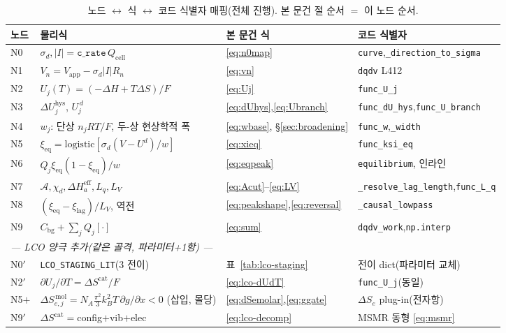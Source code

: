 \documentclass[11pt,a4paper]{article}
\newcommand{\eff}{\mathrm{eff}}
\newcommand{\eq}{\mathrm{eq}}
\newcommand{\app}{\mathrm{app}}
\newcommand{\cell}{\mathrm{cell}}
\newcommand{\bg}{\mathrm{bg}}
\newcommand{\hys}{\mathrm{hys}}
\newcommand{\code}[1]{\texttt{#1}}
\begin{document}
\begin{table}[t]
\centering
\renewcommand{\arraystretch}{1.3}
\caption{노드 $\leftrightarrow$ 식 $\leftrightarrow$ 코드 식별자 매핑(전체 진행). 본 문건 절 순서 $=$ 이 노드 순서.}
\label{tab:nodemap}
\begin{tabular}{l l l l}
\toprule
노드 & 물리식 & 본 문건 식 & 코드 식별자 \\
\midrule
N0 & $\sigma_d,|I|=\code{c\_rate}\,Q_\cell$ & \eqref{eq:n0map} & \code{curve},\code{\_direction\_to\_sigma} \\
N1 & $V_n=V_\app-\sigma_d|I|R_n$ & \eqref{eq:vn} & \code{dqdv} L412 \\
N2 & $U_j(T)=(-\Delta H+T\Delta S)/F$ & \eqref{eq:Uj} & \code{func\_U\_j} \\
N3 & $\Delta U_j^\hys$, $U_j^{\,d}$ & \eqref{eq:dUhys},\eqref{eq:Ubranch} & \code{func\_dU\_hys},\code{func\_U\_branch} \\
N4 & $w_j$: 단상 $n_jRT/F$, 두-상 현상학적 폭 & \eqref{eq:wbase}, \S\ref{sec:broadening} & \code{func\_w},\code{\_width} \\
N5 & $\xi_\eq=\mathrm{logistic}[\sigma_d(V-U^d)/w]$ & \eqref{eq:xieq} & \code{func\_ksi\_eq} \\
N6 & $Q_j\xi_\eq(1-\xi_\eq)/w$ & \eqref{eq:eqpeak} & \code{equilibrium}, 인라인 \\
N7 & $\mathcal A,\chi_d,\Delta H_a^\eff,L_q,L_V$ & \eqref{eq:Acut}--\eqref{eq:LV} & \code{\_resolve\_lag\_length},\code{func\_L\_q} \\
N8 & $(\xi_\eq-\xi_\mathrm{lag})/L_V$, 역전 & \eqref{eq:peakshape},\eqref{eq:reversal} & \code{\_causal\_lowpass} \\
N9 & $C_\bg+\sum_jQ_j[\cdot]$ & \eqref{eq:sum} & \code{dqdv\_work},\code{np.interp} \\
\midrule
\multicolumn{4}{l}{\emph{— LCO 양극 추가(같은 골격, 파라미터+1항) —}}\\
N0$'$ & \code{LCO\_STAGING\_LIT}(3 전이) & 표~\ref{tab:lco-staging} & 전이 dict(파라미터 교체) \\
N2$'$ & $\partial U_j/\partial T=\Delta S^\mathrm{cat}/F$ & \eqref{eq:lco-dUdT} & \code{func\_U\_j}(동일) \\
N5$+$ & $\Delta S_{e,j}^{\,\mathrm{mol}}=N_A\tfrac{\pi^2}{3}k_B^2T\,\partial g/\partial x<0$ (삽입, 몰당) & \eqref{eq:dSemolar},\eqref{eq:ggate} & $\Delta S_e$ plug-in(전자항) \\
N9$'$ & $\Delta S^\mathrm{cat}=$config$+$vib$+$elec & \eqref{eq:lco-decomp} & MSMR 동형 \eqref{eq:msmr} \\
\bottomrule
\end{tabular}
\end{table}
\end{document}
